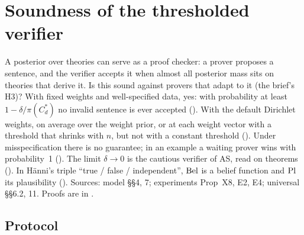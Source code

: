 \section{Soundness of the thresholded verifier}\label{sec:sound}

A posterior over theories can serve as a proof checker: a prover proposes a sentence, and the verifier accepts it when almost all posterior mass sits on theories that derive it. Is this sound against provers that adapt to it (the brief's H3)? With fixed weights and well-specified data, yes: with probability at least $1-\delta/\pi(C^*_d)$ no invalid sentence is ever accepted (). With the default Dirichlet weights, on average over the weight prior, or at each weight vector with a threshold that shrinks with $n$, but not with a constant threshold (). Under misspecification there is no guarantee; in an example a waiting prover wins with probability~1 (). The limit $\delta\to0$ is the cautious verifier of AS, read on theorems (). In H\"anni's triple ``true / false / independent'', $\mathrm{Bel}$ is a belief function and $\mathrm{Pl}$ its plausibility (). Sources: model \S\S4, 7; experiments Prop~X8, E2, E4; universal \S\S6.2, 11. Proofs are in .

\subsection{Protocol}\label{sec:sound:protocol}

